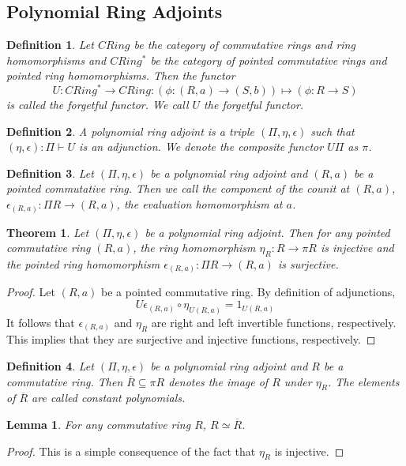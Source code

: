 \documentclass[12pt]{article}
\newtheorem{defn}{Definition}
\newtheorem{lem}{Lemma}
\newtheorem{thm}{Theorem}
\begin{document}
\subsection{Polynomial Ring Adjoints}
\begin{defn}
  Let $CRing$ be the category of commutative rings and ring homomorphisms and $CRing^{*}$ be the category of pointed commutative rings and pointed
  ring homomorphisms. Then the functor $$U:CRing^{*}\to CRing:(\phi:(R,a)\to(S,b))\mapsto(\phi:R\to S)$$
  is called the forgetful functor. We call $U$ the forgetful functor.
\end{defn}
\begin{defn}
  A polynomial ring adjoint is a triple $(\Pi,\eta,\epsilon)$ such that $(\eta,\epsilon):\Pi\vdash U$ is an adjunction.
  We denote the composite functor $U\Pi$ as $\pi$.
\end{defn}
\begin{defn}
  Let $(\Pi,\eta,\epsilon)$ be a polynomial ring adjoint and $(R,a)$ be a pointed commutative ring. Then we call the component of the counit at $(R, a)$, $\epsilon_{(R,a)}:\Pi R \to (R, a)$, the evaluation homomorphism at $a$. 
\end{defn}
\begin{thm}
  Let $(\Pi,\eta,\epsilon)$ be a polynomial ring adjoint. Then for any pointed commutative ring $(R,a)$, the ring homomorphism $\eta_{R}:R\to\pi R$ is injective and
  the pointed ring homomorphism $\epsilon_{(R,a)}:\Pi R\to(R,a)$ is surjective.
\end{thm}
\begin{proof}
  Let $(R,a)$ be a pointed commutative ring. By definition of adjunctions,
  $$U\epsilon_{(R,a)}\circ\eta_{U(R,a)} = 1_{U(R,a)}$$
  It follows that $\epsilon_{(R,a)}$ and $\eta_{R}$ are right and left invertible functions, respectively.
  This implies that they are surjective and injective functions, respectively.
\end{proof}
\begin{defn}
  Let $(\Pi,\eta,\epsilon)$ be a polynomial ring adjoint and $R$ be a commutative ring. Then $\overline{R}\subseteq\pi R$ denotes the image
  of $R$ under $\eta_R$. The elements of $\overline{R}$ are called constant polynomials.
\end{defn}
\begin{lem}
  For any commutative ring $R$, $R \simeq \overline{R}$.
\end{lem}
\begin{proof}
  This is a simple consequence of the fact that $\eta_R$ is injective.
\end{proof}
\end{document}
